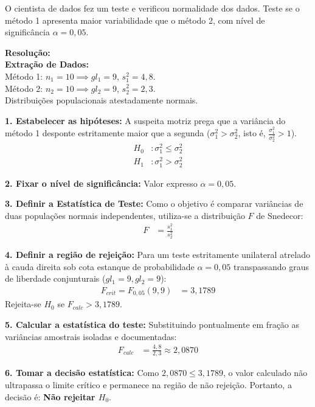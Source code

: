 \documentclass[12pt, a4paper]{article}
\begin{document}
\medskip\noindent O cientista de dados fez um teste e verificou normalidade dos dados. Teste se o método 1 apresenta maior variabilidade que o método 2, com nível de significância $\alpha = 0{,}05$.

\vspace{0.3cm}
\noindent\textbf{Resolução:}\\
\textbf{Extração de Dados:} \\
Método 1: $n_1 = 10 \implies gl_1 = 9$, $s^2_1 = 4{,}8$. \\
Método 2: $n_2 = 10 \implies gl_2 = 9$, $s^2_2 = 2{,}3$. \\
Distribuições populacionais atestadamente normais.

\medskip\noindent \textbf{1. Estabelecer as hipóteses:}
A suspeita motriz prega que a variância do método 1 desponte estritamente maior que a segunda ($\sigma^2_1 > \sigma^2_2$, isto é, $\frac{\sigma^2_1}{\sigma^2_2} > 1$).
\begin{align*}
H_0 &: \sigma^2_1 \le \sigma^2_2 \\
H_1 &: \sigma^2_1 > \sigma^2_2
\end{align*}

\noindent \textbf{2. Fixar o nível de significância:}
Valor expresso $\alpha = 0{,}05$.

\noindent \textbf{3. Definir a Estatística de Teste:}
Como o objetivo é comparar variâncias de duas populações normais 
independentes, utiliza-se a distribuição $F$ de Snedecor:
\begin{align*}
F &= \frac{s^2_1}{s^2_2}
\end{align*}

\noindent \textbf{4. Definir a região de rejeição:}
Para um teste estritamente unilateral atrelado à cauda direita sob cota estanque de probabilidade $\alpha = 0{,}05$ transpassando graus de liberdade conjunturais ($gl_1=9, gl_2=9$):
\begin{align*}
F_{crit} = F_{0{,}05}(9, 9) &= \boxed{3{,}1789}
\end{align*}
Rejeita-se $H_0$ se $F_{calc} > 3{,}1789$.

\noindent \textbf{5. Calcular a estatística do teste:}
Substituindo pontualmente em fração as variâncias amostrais isoladas e documentadas:
\begin{align*}
F_{calc} &= \frac{4{,}8}{2{,}3} \approx \boxed{2{,}0870}
\end{align*}


\noindent \textbf{6. Tomar a decisão estatística:}
Como $2{,}0870 \le 3{,}1789$, o valor calculado não ultrapassa o limite 
crítico e permanece na região de não rejeição. Portanto, a decisão é: 
\textbf{Não rejeitar $H_0$}.
\end{document}

